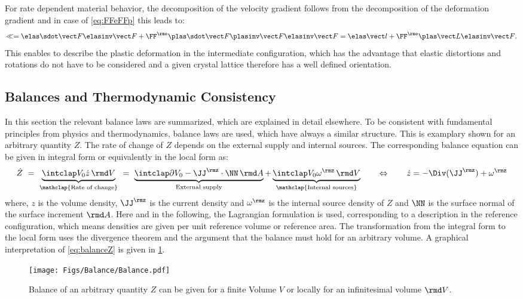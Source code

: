  For rate dependent material behavior, the decomposition of the velocity gradient follows from the decomposition of the deformation gradient and in case of \cref{eq:FFeFFp} this leads to:
\begin{align}
  \ll = \FFedot\FFeinv + \FFe \FFpdot \FFpinv \FFeinv = \lle + \FFe\LLp\FFeinv.
\end{align}
This enables to describe the plastic deformation in the intermediate configuration, which has the advantage that elastic distortions and rotations do not have to be considered and a given crystal lattice therefore has a well defined orientation.

\subsection{Balances and Thermodynamic Consistency}
In this section the relevant balance laws are summarized, which are explained in detail elsewhere\supercite{hertel_continuum_2012}. To be consistent with fundamental principles from physics and thermodynamics, balance laws are used, which have always a similar structure. This is examplary shown for an arbitrary quantity $Z$. The rate of change of $Z$ depends on the external supply and internal sources. The corresponding balance equation can be given in integral form or equivalently in the local form as:
\begin{align}
  \dot Z  \ = \ \underbrace{ \intVO \dot z \dV}_{\mathclap{\text{Rate of change}}} \ = \ \underbrace{\intdVO -\JJ^{\rmz} \cdot \NN\dA}_{\text{External supply}} + \underbrace{\intVO \omega^{\rmz} \dV}_{\mathclap{\text{Internal sources}}} 
  \qquad \Leftrightarrow \qquad \dot z = -\Div(\JJ^{\rmz}) + \omega^{\rmz}
  \label{eq:balanceZ}
\end{align} 
where, $z$ is the volume density, $\JJ^\rmz$ is the current density and $\omega^\rmz$ is the internal source density of $Z$ and $\NN$ is the surface normal of the surface increment $\rmd A$. Here and in the following, the Lagrangian formulation is used, corresponding to a description in the reference configuration, which means densities are given per unit reference volume or reference area. The transformation from the integral form to the local form uses the divergence theorem and the argument that the balance must hold for an arbitrary volume. A graphical interpretation of \cref{eq:balanceZ} is given in \cref{fig:Balance}.
\begin{figure}[h!]
  \centering
  \texttt{[image: Figs/Balance/Balance.pdf]}
  \caption[]{Balance of an arbitrary quantity $Z$ can be given for a finite Volume $V$ or locally for an infinitesimal volume $\rmd V$.}
  \label{fig:Balance}
\end{figure}

